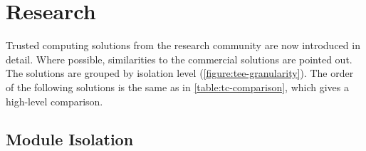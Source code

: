 \section{Research\label{ID_1218417925}\label{section:tc-research}}
Trusted computing solutions from the research community are now introduced in detail.\label{ID_1414676979}
Where possible, similarities to the commercial solutions are pointed out.\label{ID_837800524}
The solutions are grouped by isolation level (\autoref{figure:tee-granularity}).\label{ID_1121208378}
The order of the following solutions is the same as in \autoref{table:tc-comparison}, which gives a high-level comparison.\label{ID_1270744760}
\subsection{Module Isolation\label{ID_833475083}}
